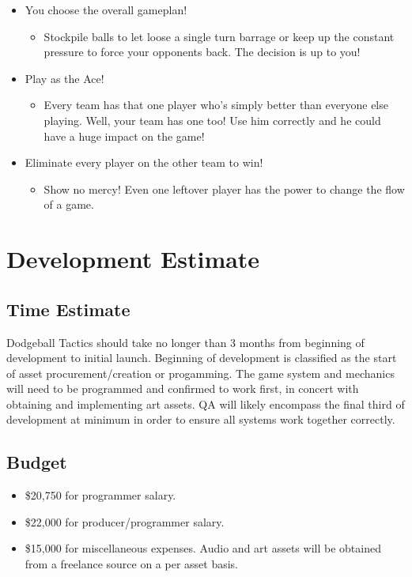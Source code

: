 \documentclass [12pt]{article}
\begin{document}
\begin{itemize}
\item You choose the overall gameplan!
	\begin{itemize}
	\item Stockpile balls to let loose a single turn barrage or keep up the constant pressure to force your opponents back. The decision is up to you!
	\end{itemize}

\item Play as the Ace!
	\begin{itemize}
	\item Every team has that one player who's simply better than everyone else playing. Well, your team has one too! Use him correctly and he could have a huge impact on the game!
	\end{itemize}

\item Eliminate every player on the other team to win!
	\begin{itemize}
	\item Show no mercy! Even one leftover player has the power to change the flow of a game.
	\end{itemize}

\end{itemize}

\section*{Development Estimate}

\subsection*{Time Estimate}

Dodgeball Tactics should take no longer than 3 months from beginning of development to initial launch. Beginning of development is classified as the start of asset procurement/creation or progamming. The game system and mechanics will need to be programmed and confirmed to work first, in concert with obtaining and implementing art assets. QA will likely encompass the final third of development at minimum in order to ensure all systems work together correctly.

\subsection*{Budget}

\begin{itemize}
\item \$20,750 for programmer salary.
\item \$22,000 for producer/programmer salary.
\item \$15,000 for miscellaneous expenses. Audio and art assets will be obtained from a freelance source on a per asset basis.
\end{itemize}
\newpage
\end{document}
